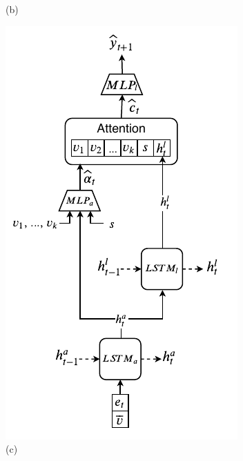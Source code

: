 \begin{figure}[th]
\begin{minipage}{.20\textwidth}
		(b)
	\end{minipage}%
	\begin{minipage}{.20\textwidth}
		\centering
		\includegraphics[scale=0.43]{studies/inlg2019/figures/bottom-up+s.pdf}\\
		(c)
	\end{minipage}%
	\begin{minipage}{.20\textwidth}
		\centering

\end{minipage}
\end{figure}
